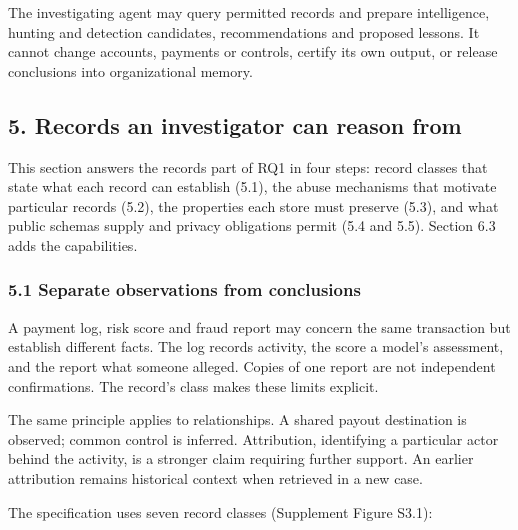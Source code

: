 \documentclass[
  11pt,
]{article}
\begin{document}
The investigating agent may query permitted records and prepare
intelligence, hunting and detection candidates, recommendations and
proposed lessons. It cannot change accounts, payments or controls,
certify its own output, or release conclusions into organizational
memory.

\FloatBarrier

\hypertarget{records-an-investigator-can-reason-from}{%
\subsection{5. Records an investigator can reason
from}\label{records-an-investigator-can-reason-from}}

\suppressfloats[t]

This section answers the records part of RQ1 in four steps: record
classes that state what each record can establish (5.1), the abuse
mechanisms that motivate particular records (5.2), the properties each
store must preserve (5.3), and what public schemas supply and privacy
obligations permit (5.4 and 5.5). Section 6.3 adds the capabilities.

\hypertarget{separate-observations-from-conclusions}{%
\subsubsection{5.1 Separate observations from
conclusions}\label{separate-observations-from-conclusions}}

A payment log, risk score and fraud report may concern the same
transaction but establish different facts. The log records activity, the
score a model's assessment, and the report what someone alleged. Copies
of one report are not independent confirmations. The record's class
makes these limits explicit.

The same principle applies to relationships. A shared payout destination
is observed; common control is inferred. Attribution, identifying a
particular actor behind the activity, is a stronger claim requiring
further support. An earlier attribution remains historical context when
retrieved in a new case.

The specification uses seven record classes (Supplement Figure S3.1):
\end{document}
